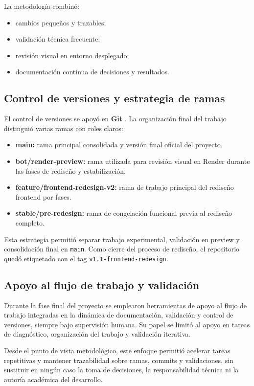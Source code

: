 La metodología combinó:
\begin{itemize}
    \item cambios pequeños y trazables;
    \item validación técnica frecuente;
    \item revisión visual en entorno desplegado;
    \item documentación continua de decisiones y resultados.
\end{itemize}

\subsection{Control de versiones y estrategia de ramas}

El control de versiones se apoyó en \textbf{Git} \cite{progit}. La organización final del trabajo distinguió varias ramas con roles claros:

\begin{itemize}
    \item \textbf{main:} rama principal consolidada y versión final oficial del proyecto.
    \item \textbf{bot/render-preview:} rama utilizada para revisión visual en Render durante las fases de rediseño y estabilización.
    \item \textbf{feature/frontend-redesign-v2:} rama de trabajo principal del rediseño frontend por fases.
    \item \textbf{stable/pre-redesign:} rama de congelación funcional previa al rediseño completo.
\end{itemize}

Esta estrategia permitió separar trabajo experimental, validación en preview y consolidación final en \texttt{main}. Como cierre del proceso de rediseño, el repositorio quedó etiquetado con el tag \texttt{v1.1-frontend-redesign}.

\subsection{Apoyo al flujo de trabajo y validación}

Durante la fase final del proyecto se emplearon herramientas de apoyo al flujo de trabajo integradas en la dinámica de documentación, validación y control de versiones, siempre bajo supervisión humana. Su papel se limitó al apoyo en tareas de diagnóstico, organización del trabajo y validación iterativa.

Desde el punto de vista metodológico, este enfoque permitió acelerar tareas repetitivas y mantener trazabilidad sobre ramas, commits y validaciones, sin sustituir en ningún caso la toma de decisiones, la responsabilidad técnica ni la autoría académica del desarrollo.

